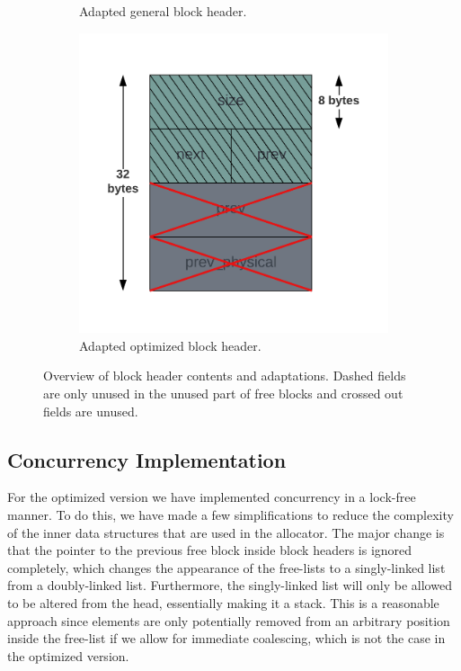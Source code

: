 \begin{figure}[H]
\begin{subfigure}[b]{0.3\textwidth}
        \caption{Adapted general block header.}
        \label{fig:blockheader_adap_general}
    \end{subfigure}%
    \hfill
    \begin{subfigure}[b]{0.3\textwidth}
        \centering
        \includegraphics[width=\textwidth]{figures/blockheader_adap_optimized.png}
        \caption{Adapted optimized block header.}
        \label{fig:blockheader_adap_optimized}
    \end{subfigure}
    \caption{Overview of block header contents and adaptations. Dashed fields are only unused in the unused part of free blocks and crossed out fields are unused.}
    \label{fig:blockheader_adaptations}
\end{figure}

\subsection{Concurrency Implementation}
\label{sec:adaptations_impl:concurrency}

For the optimized version we have implemented concurrency in a lock-free manner. To do this, we have made a few simplifications to reduce the complexity of the inner data structures that are used in the allocator. The major change is that the pointer to the previous free block inside block headers is ignored completely, which changes the appearance of the free-lists to a singly-linked list from a doubly-linked list. Furthermore, the singly-linked list will only be allowed to be altered from the head, essentially making it a stack. This is a reasonable approach since elements are only potentially removed from an arbitrary position inside the free-list if we allow for immediate coalescing, which is not the case in the optimized version.

